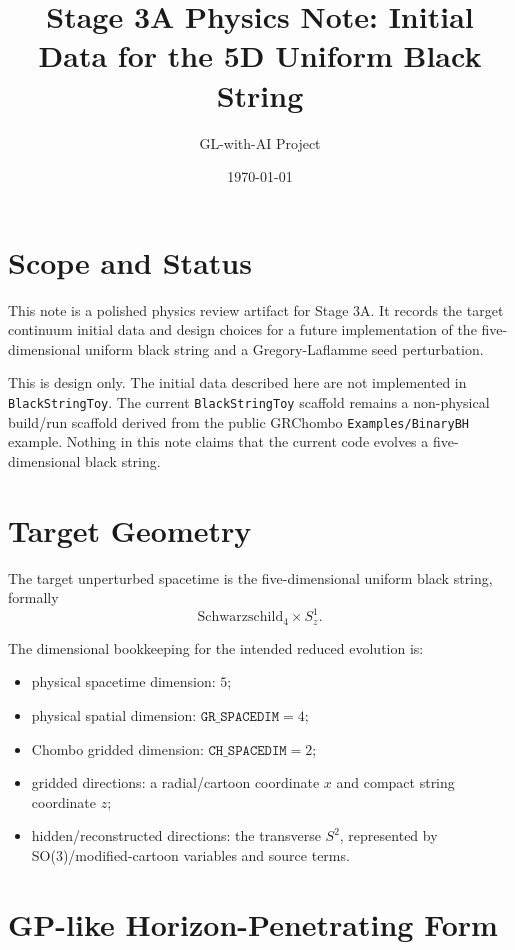 \documentclass[11pt]{article}
\title{Stage 3A Physics Note: Initial Data for the 5D Uniform Black String}
\author{GL-with-AI Project}
\date{\today}
\newcommand{\GRSP}{\texttt{GR\_SPACEDIM}}
\newcommand{\CHSP}{\texttt{CH\_SPACEDIM}}
\begin{document}
\maketitle

\section{Scope and Status}

This note is a polished physics review artifact for Stage 3A. It records the
target continuum initial data and design choices for a future implementation of
the five-dimensional uniform black string and a Gregory-Laflamme seed
perturbation.

This is design only. The initial data described here are not implemented in
\texttt{BlackStringToy}. The current \texttt{BlackStringToy} scaffold remains a
non-physical build/run scaffold derived from the public GRChombo
\texttt{Examples/BinaryBH} example. Nothing in this note claims that the
current code evolves a five-dimensional black string.

\section{Target Geometry}

The target unperturbed spacetime is the five-dimensional uniform black string,
formally
\begin{equation}
  \mathrm{Schwarzschild}_4 \times S^1_z .
\end{equation}

The dimensional bookkeeping for the intended reduced evolution is:
\begin{itemize}
  \item physical spacetime dimension: \(5\);
  \item physical spatial dimension: \(\GRSP = 4\);
  \item Chombo gridded dimension: \(\CHSP = 2\);
  \item gridded directions: a radial/cartoon coordinate \(x\) and compact
    string coordinate \(z\);
  \item hidden/reconstructed directions: the transverse \(S^2\), represented by
    SO(3)/modified-cartoon variables and source terms.
\end{itemize}

\section{GP-like Horizon-Penetrating Form}
\end{document}
